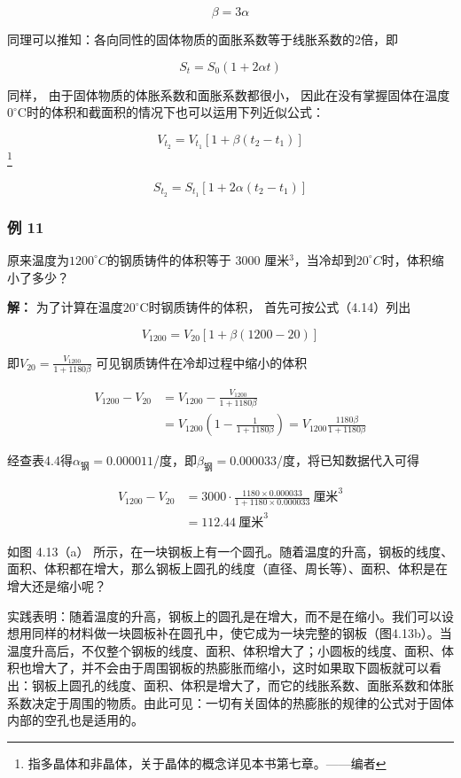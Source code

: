 \[
\beta = 3 \alpha \tag {4.12}
\]

同理可以推知：各向同性的固体物质的面胀系数等于线胀系数的2倍，即

\[
S _ {t} = S _ {0} (1 + 2 \alpha t) \tag {4.13}
\]

同样， 由于固体物质的体胀系数和面胀系数都很小，
因此在没有掌握固体在温度\(0^{\circ} \mathrm{C}\)时的体积和截面积的情况下也可以运用下列近似公式：

\[
V_{t_2}=V_{t_1}[1+\beta(t_2-t_1)] \tag{4.14}
\]\footnote{指多晶体和非晶体，关于晶体的概念详见本书第七章。------编者}

\[
S_{t_2}=S_{t_1}[1+2\alpha(t_2-t_1)] \tag{4.15}
\]

\subsubsection{例 11}\label{ux4f8b-11}

原来温度为\(1200^{\circ}C\)的钢质铸件的体积等于 3000
厘米\(^{3}\)，当冷却到\(20^{\circ}C\)时，体积缩小了多少？

\textbf{解：} 为了计算在温度\(20^{\circ} \mathrm{C}\)时钢质铸件的体积，
首先可按公式（4.14）列出

\[
V _ {1200} = V _ {20} [ 1 + \beta (1200 - 20) ]
\]

即\(V_{20} = \frac{V_{1200}}{1 + 1180\beta}\)
可见钢质铸件在冷却过程中缩小的体积

\[
\begin{aligned}V_{1200}-V_{20}&=V_{1200}-\frac{V_{1200}}{1+1180\beta}\\&=V_{1200}\left(1-\frac{1}{1+1180\beta}\right)=V_{1200}\frac{1180\beta}{1+1180\beta}\end{aligned}
\]

经查表4.4得\(\alpha_{\text{钢}} = 0.000011\)/度，即\(\beta_{\text{钢}} = 0.000033\)/度，将已知数据代入可得

\[
\begin{aligned}V_{1200}-V_{20}&=3000\cdot\frac{1180\times0.000033}{1+1180\times0.000033}\ \text{厘米}^3\\&=112.44\ \text{厘米}^3\end{aligned}
\]

如图 4.13（a）
所示，在一块钢板上有一个圆孔。随着温度的升高，钢板的线度、面积、体积都在增大，那么钢板上圆孔的线度（直径、周长等）、面积、体积是在增大还是缩小呢？

实践表明：随着温度的升高，钢板上的圆孔是在增大，而不是在缩小。我们可以设想用同样的材料做一块圆板补在圆孔中，使它成为一块完整的钢板（图4.13b）。当温度升高后，不仅整个钢板的线度、面积、体积增大了；小圆板的线度、面积、体积也增大了，并不会由于周围钢板的热膨胀而缩小，这时如果取下圆板就可以看出：钢板上圆孔的线度、面积、体积是增大了，而它的线胀系数、面胀系数和体胀系数决定于周围的物质。由此可见：一切有关固体的热膨胀的规律的公式对于固体内部的空孔也是适用的。

